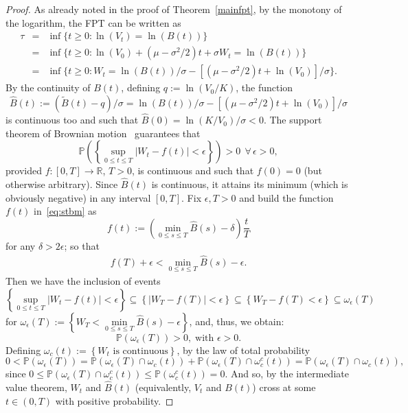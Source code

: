 \documentclass[12pt]{article}
\theoremstyle{definition}
\begin{document}
\begin{proof}
As already noted in the proof of Theorem~\ref{mainfpt}, by the monotony of the logarithm, the FPT can be written as
\begin{eqnarray}\nonumber
\tau &=& \inf \{t \ge 0 : \ln(V_t) = \ln(B(t))\}\\ \nonumber
&=& \inf \{t \ge 0 : \ln(V_0) + (\mu - \sigma^2/2)t + \sigma W_t = \ln(B(t)) \} \\ \nonumber
&=& \inf \{t \ge 0 : W_t = \ln(B(t))/\sigma - \left[(\mu - \sigma^2/2)t + \ln(V_0) \right]/\sigma \}.
\end{eqnarray}
By the continuity of $B(t)$, defining $q:=\ln(V_0/K)$, the function
$$
\hat{B}(t):=(\tilde{B}(t) -q)/\sigma= \ln(B(t))/\sigma - \left[(\mu - \sigma^2/2)t + \ln(V_0) \right]/\sigma
$$
is continuous too and such that $\hat{B}(0) = \ln(K/V_0)/\sigma <0$. The support theorem of Brownian motion~\cite{brownian2010morters} guarantees that
\begin{equation}\label{eq:stbm}
\mathbb{P} \left( \left\{ \sup_{0 \le t \le T} |W_t - f(t)| < \epsilon \right\} \right) >0\;\,\forall\,\epsilon>0,
\end{equation}
provided $f:[0,T] \longrightarrow \mathbb{R}$, $T>0$, is continuous and such that $f(0)=0$ (but otherwise arbitrary).
Since $\hat{B}(t)$ is continuous, it attains its minimum (which is obviously negative) in any interval $[0,T]$. Fix $\epsilon, T >0$ and build the function $f(t)$ in~\eqref{eq:stbm} as
$$
f(t) := \left( \min_{0 \le s \le T} \hat{B}(s) -\delta \right) \frac{t}{T}
$$
for any $\delta > 2\epsilon$; so that
\begin{eqnarray}\nonumber
f(T) + \epsilon < \min_{0 \le s \le T} \hat{B}(s) -\epsilon.
\end{eqnarray}
Then we have the inclusion of events
\begin{equation}\nonumber
\left\{ \sup_{0 \le t \le T} |W_t - f(t)| < \epsilon \right\} \subseteq\left\{ |W_T - f(T)| < \epsilon \right\} 
\subseteq \left\{ W_T - f(T) < \epsilon \right\}
\subseteq\omega_\epsilon(T)
\end{equation}
for $\omega_\epsilon(T):=\left\{ W_T < \min\limits_{0 \le s \le T} \hat{B}(s) -\epsilon \right\}$, and, thus, we obtain:
$$\nonumber
\mathbb{P} \left(\omega_\epsilon(T)\right) >0,\;\text{with $\epsilon >0$.}
$$
 Defining $\omega_{c}(t):=\left\{ \text{$W_t$ is continuous} \right\}$, by the law of total probability
\begin{equation}\nonumber
0 < \mathbb{P} \left( \omega_\epsilon(T) \right)
= \mathbb{P} \left( \omega_\epsilon(T) \cap \omega_{c}(t) \right)+
\mathbb{P} \left( \omega_\epsilon(T) \cap \omega_{c}^c(t) \right)
=\mathbb{P} \left( \omega_\epsilon(T)\cap \omega_{c}(t)\right),
\end{equation}
since $
0 \le \mathbb{P} \left(\omega_\epsilon(T)\cap \omega_{c}^c(t) \right)
\le \mathbb{P} \left( \omega_{c}^c(t) \right)=0$. And so, by the intermediate value theorem, $W_t$ and $\hat{B}(t)$ (equivalently, $V_t$ and $B(t)$) cross at some $t \in (0,T)$ with positive probability.
\end{proof}
\end{document}
